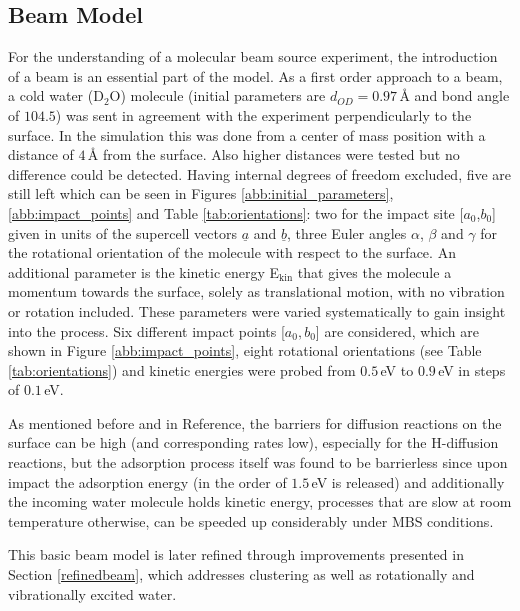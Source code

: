 \documentclass[11pt,DIV=13,BCOR=5mm,a4paper,headinclude]{scrbook}
\renewcommand{\vec}[1]{\underline{#1}}
\begin{document}
\subsection{Beam Model} \label{beammodel}
For the understanding of a molecular beam source experiment, the introduction of a beam is an essential part of the model.
As a first order approach to a beam, a cold water (D$_2$O) molecule (initial parameters are $d_{OD}=0.97\,$\AA{} and bond angle of $104.5$\textdegree) was sent in agreement with the experiment perpendicularly to the surface.
In the simulation this was done from a center of mass position with a distance of $4\,$\AA{} from the surface.
Also higher distances were tested but no difference could be detected. %
Having internal degrees of freedom excluded, five are still left which can be seen in Figures \ref{abb:initial_parameters}, \ref{abb:impact_points} and Table \ref{tab:orientations}: two for the impact site [$a_0$,$b_0$] given in units of the supercell vectors $\vec{a}$ and $\vec{b}$, three Euler angles $\alpha$, $\beta$ and $\gamma$ for the rotational orientation of the molecule with respect to the surface.
An additional parameter is the kinetic energy E$_\textrm{kin}$ that gives the molecule a momentum towards the surface, solely as translational motion, with no vibration or rotation included.
These parameters were varied systematically to gain insight into the process.
Six different impact points [$a_0,b_0$] are considered, which are shown in Figure \ref{abb:impact_points}, eight rotational orientations (see Table \ref{tab:orientations}) and kinetic energies were probed from $0.5\,$eV to $0.9\,$eV in steps of $0.1\,$eV.


As mentioned before and in Reference\cite{WirthJPCC2012}, the barriers for diffusion reactions on the surface can be high (and corresponding rates low), especially for the H-diffusion reactions, but the adsorption process itself was found to be barrierless since upon impact the adsorption energy (in the order of $1.5\,$eV is released) and additionally the incoming water molecule holds kinetic energy, processes that are slow at room temperature otherwise, can be speeded up considerably under MBS conditions.


This basic beam model is later refined through improvements presented in Section \ref{refinedbeam}, which addresses clustering as well as rotationally and vibrationally excited water.
\end{document}
